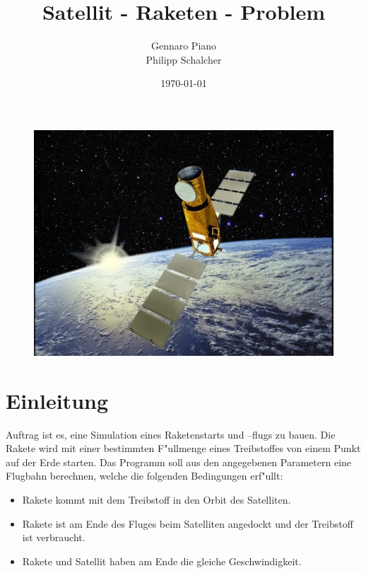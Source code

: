 \documentclass[11pt]{report}
\begin{document}
\begin{titlepage}
\title{Satellit - Raketen - Problem}
\begin{figure}[t]
\centering
\includegraphics{corot-Ausschnitt-klein.jpg}
\label{title}
\end{figure}
\author{Gennaro Piano \\ Philipp Schalcher}
\date{\today}
\maketitle
\end{titlepage}
	
\tableofcontents
\newpage
	
\chapter{Einleitung}
Auftrag ist es, eine Simulation eines Raketenstarts und –flugs zu bauen. Die Rakete wird mit einer bestimmten F"ullmenge eines Treibstoffes von einem Punkt auf der Erde starten. Das Programm soll aus den angegebenen Parametern eine Flugbahn berechnen, welche die folgenden Bedingungen erf"ullt:
	
\begin{itemize}
\item Rakete kommt mit dem Treibstoff in den Orbit des Satelliten.
\item Rakete ist am Ende des Fluges beim Satelliten angedockt und der Treibstoff ist verbraucht.
\item Rakete und Satellit haben am Ende die gleiche Geschwindigkeit.
\end{itemize}
\end{document}
